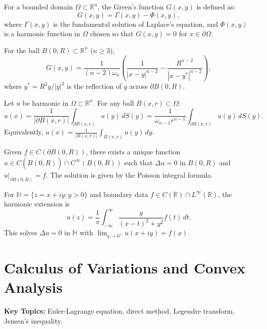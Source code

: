 \begin{definition}
For a bounded domain $\Omega \subset \mathbb{R}^n$, the Green's function $G(x,y)$ is defined as:
\[
G(x,y) = \Gamma(x,y) - \Phi(x,y),
\]
where $\Gamma(x,y)$ is the fundamental solution of Laplace's equation, and $\Phi(x,y)$ is a harmonic function in $\Omega$ chosen so that $G(x,y) = 0$ for $x \in \partial \Omega$.
\end{definition}

\begin{example}
For the ball $B(0,R) \subset \mathbb{R}^n$ ($n \geq 3$),
\[
G(x,y) = \frac{1}{(n-2)\omega_n} \left( \frac{1}{|x-y|^{n-2}} - \frac{R^{n-2}}{|x - y^*|^{n-2}} \right),
\]
where $y^* = R^2 y / |y|^2$ is the reflection of $y$ across $\partial B(0,R)$.
\end{example}

\begin{theorem}
Let $u$ be harmonic in $\Omega \subset \mathbb{R}^n$. For any ball $B(x,r) \subset \Omega$:
\[
u(x) = \frac{1}{| \partial B(x,r) |} \int_{\partial B(x,r)} u(y) \, dS(y) = \frac{1}{\omega_{n-1} r^{n-1}} \int_{\partial B(x,r)} u(y) \, dS(y).
\]
Equivalently, $u(x) = \frac{1}{|B(x,r)|} \int_{B(x,r)} u(y) \, dy$.
\end{theorem}

\begin{theorem}
Given $f \in C(\partial B(0,R))$, there exists a unique function $u \in C(\overline{B(0,R)}) \cap C^\infty(B(0,R))$ such that $\Delta u = 0$ in $B(0,R)$ and $u|_{\partial B(0,R)} = f$. The solution is given by the Poisson integral formula.
\end{theorem}

\begin{example}
For $\mathbb{H} = \{z = x+iy : y > 0\}$ and boundary data $f \in C(\mathbb{R}) \cap L^\infty(\mathbb{R})$, the harmonic extension is
\[
u(z) = \frac{1}{\pi} \int_{-\infty}^{\infty} \frac{y}{(x-t)^2 + y^2} f(t) \, dt.
\]
This solves $\Delta u = 0$ in $\mathbb{H}$ with $\lim_{y \to 0^+} u(x+iy) = f(x)$.
\end{example}

\section{Calculus of Variations and Convex Analysis}

\textbf{Key Topics:} Euler-Lagrange equation, direct method, Legendre transform, Jensen's inequality.


